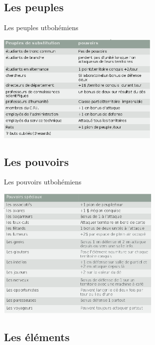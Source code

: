 \documentclass{beamer}
\begin{document}
	\subsection{Les peuples}

\begin{frame}{Les peuples utbohémiens}

\begin{center}
	\includegraphics[width=8cm]{peuples.png}
\end{center}

\end{frame}


	\subsection{Les pouvoirs}

\begin{frame}{Les pouvoirs utbohémiens}

\begin{center}
	\includegraphics[width=8cm]{pouvoirs.png}
\end{center}

\end{frame}

	\subsection{Les éléments}
\end{document}

